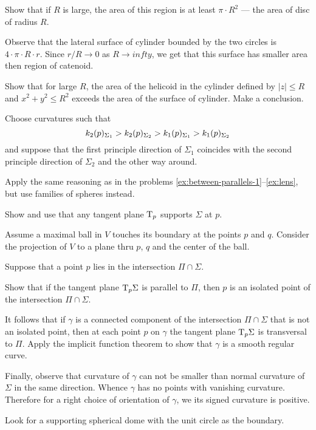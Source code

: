 Show that if $R$ is large, the area of this region is at least $\pi\cdot R^2$ --- the area of disc of radius $R$.

Observe that the lateral surface of cylinder bounded by the two circles is $4\cdot \pi\cdot R\cdot r$.
Since $r/R\to 0$ as $R\to infty$, we get that this surface has smaller area then region of catenoid.


Show that for large $R$, the area of the helicoid in the cylinder defined by $|z|\le R$ and $x^2+y^2\le R^2$ exceeds the area of the surface of cylinder.
Make a conclusion.

Choose curvatures such that 
\[k_2(p)_{\Sigma_1}\z>k_2(p)_{\Sigma_2}> k_1(p)_{\Sigma_1}> k_1(p)_{\Sigma_2}\] and suppose that the first principle direction of $\Sigma_1$ coincides with the second principle direction of $\Sigma_2$ and the other way around.

 Apply the same reasoning as in the problems \ref{ex:between-parallels-1}--\ref{ex:lens}, but use families of spheres instead.


 Show and use that any tangent plane $\mathrm{T}_p$ supports $\Sigma$ at $p$.

Assume a maximal ball in $V$ touches its boundary at the points $p$ and $q$.
Consider the projection of $V$ to a plane thru $p$, $q$ and the center of the ball. 

Suppose that a point $p$ lies in the intersection $\Pi\cap\Sigma$.

Show that if the tangent plane $\mathrm{T}_p\Sigma$ is parallel to $\Pi$,
then $p$ is an isolated point of the intersection $\Pi\cap\Sigma$.

It follows that if $\gamma$ is a connected component of the intersection $\Pi\cap\Sigma$ that is not an isolated point,
then at each point $p$ on $\gamma$ the tangent plane $\mathrm{T}_p\Sigma$ is transversal to $\Pi$.
Apply the implicit function theorem to show that $\gamma$ is a smooth regular curve.

Finally, observe that curvature of $\gamma$ can not be smaller than normal curvature of $\Sigma$ in the same direction.
Whence $\gamma$ has no points with vanishing curvature.
Therefore for a right choice of orientation of $\gamma$, we its signed curvature is positive.

Look for a supporting spherical dome with the unit circle as the boundary.

